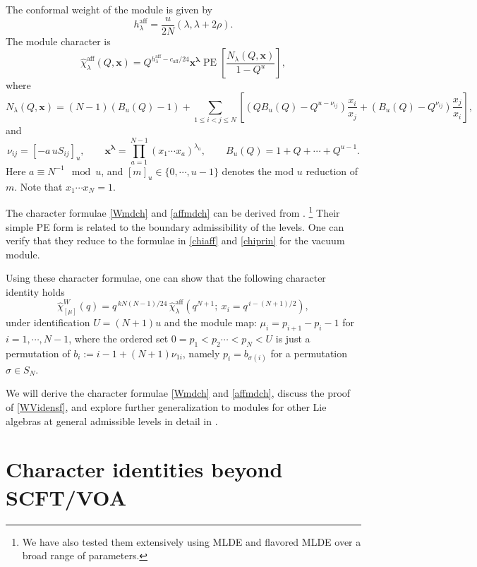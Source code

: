 \documentclass[a4paper,11pt]{article}
\theoremstyle{definition}
\theoremstyle{definition}
\theoremstyle{remark}
\newcommand{\be}{\begin{equation}}
\newcommand{\ee}{\end{equation}}
\begin{document}
The conformal weight of the module is given by
\be\label{eq:typeA-affine-label-weight}
h^{\mathrm{aff}}_\lambda=\frac{u}{2N}(\lambda,\lambda+2\rho).
\ee
The module character is 
 \be \label{affmdch}
\widehat\chi_{\lambda}^{\mathrm{aff}}(Q,\bm x) = Q^{h^{\mathrm{aff}}_{\lambda} - c_{\mathrm{aff}}/24} \bm x^{\bm \lambda} \operatorname{PE} \left[ \frac{ {N}_{\lambda}(Q,\bm x)}{1 - Q^u} \right],
\ee
where 
 \be
 {N}_{\lambda}(Q,\bm x)  = (N - 1)(B_u(Q) - 1) 
 + \sum_{1 \le i < j \le N} \left[ (Q B_u(Q) - Q^{u - \nu_{ij}}) \frac{x_i}{x_j} + (B_u(Q) - Q^{\nu_{ij}}) \frac{x_j}{x_i} \right],
\ee 
and
  \be
   \nu_{ij}=[-a\,uS_{ij}]_u , \qquad 
\bm x^{\bm \lambda}   = \prod_{a=1}^{N-1} (x_1 \cdots x_a)^{\lambda_a},\qquad 
B_u(Q) = 1 + Q + \cdots + Q^{u-1}.
\ee 
Here $a\equiv N^{-1} \mod u$, and  $[m]_u \in \{0, \cdots, u-1\}$ denotes the mod $u$ reduction of $m$. Note that $x_1\cdots x_N=1$.

 The character formulae  \eqref{Wmdch} and  \eqref{affmdch} can be derived from   \cite{KacWakimotoBoundary2017}.  \footnote{We have also tested them extensively using MLDE and flavored MLDE over   a broad range of parameters. }
Their simple PE form is related to the boundary admissibility of the levels. One can verify that they reduce to the    formulae in 
\eqref{chiaff} and \eqref{chiprin} for  the vacuum module.  

Using these character formulae, one can show that the following character identity holds
\be\label{WVidensf}
 \widehat\chi^W_{[\mu]}(q) =q^{\,kN(N-1)/24}\,
\widehat\chi^{\mathrm{aff}}_\lambda
\left(q^{  N+1 } ; \ x_i=q^{\,i- (N+1)/2}\right),
\ee
under   identification $  U=(N+1)u  $ and the  module map: $ \mu_i=p_{ i+1}-p_i-1  $ for $i=1, \cdots, N-1$, where    the ordered set  $0=p_1< p_2\cdots <p_N <U$ is just a permutation of  $b_i:= i-1+(N+1) \nu_{1i} $, namely  $p_i=b_{\sigma(i)}$ for a permutation $\sigma \in S_N$.

  We will derive the character formulae  \eqref{Wmdch} and  \eqref{affmdch}, discuss the   proof of  \eqref{WVidensf}, and explore further generalization  to modules  for other Lie algebras at general        admissible levels   in  detail in \cite{Jiang20272}.
 
  

 
\section{Character identities    beyond   SCFT/VOA}\label{IsingnoSCFT}
 
\end{document}
